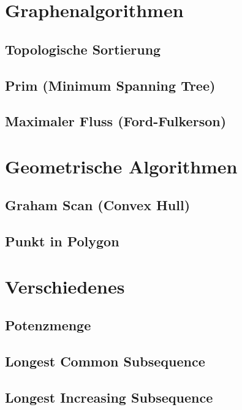 \documentclass[10pt,a4paper,ngerman]{article}
\begin{document}
\section{Graphenalgorithmen}
\subsection{Topologische Sortierung}

\subsection{Prim (Minimum Spanning Tree)}

\subsection{Maximaler Fluss (Ford-Fulkerson)}


\section{Geometrische Algorithmen}
\subsection{Graham Scan (Convex Hull)}

\subsection{Punkt in Polygon}

\section{Verschiedenes}
\subsection{Potenzmenge}

\subsection{Longest Common Subsequence}

\subsection{Longest Increasing Subsequence}

\end{document}
